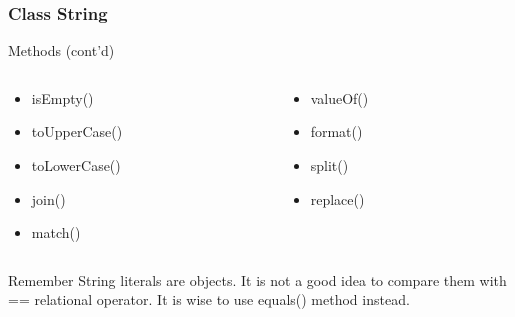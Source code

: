 \documentclass[10pt, compress]{beamer}
\begin{document}
\begin{frame}[fragile]
	\frametitle{Class String}
	\begin{block}{Methods (cont'd)}
		\begin{columns}
			\begin{column}{0.5\textwidth}
				\begin{itemize}
					\item[] isEmpty()
					\item[] toUpperCase()
					\item[] toLowerCase()
					\item[] join()
					\item[] match()
				\end{itemize}
			\end{column}
			\begin{column}{0.5\textwidth}
				\begin{itemize}
					\item[] valueOf()
					\item[] format()
					\item[] split()
					\item[] replace()
				\end{itemize}
			\end{column}
		\end{columns}
	\end{block}
	\begin{block}{Remember}
		String literals are objects. It is not a good idea to compare them with ={}= relational operator. It is wise to use equals() method instead.
	\end{block}
\end{frame}

\end{document}
